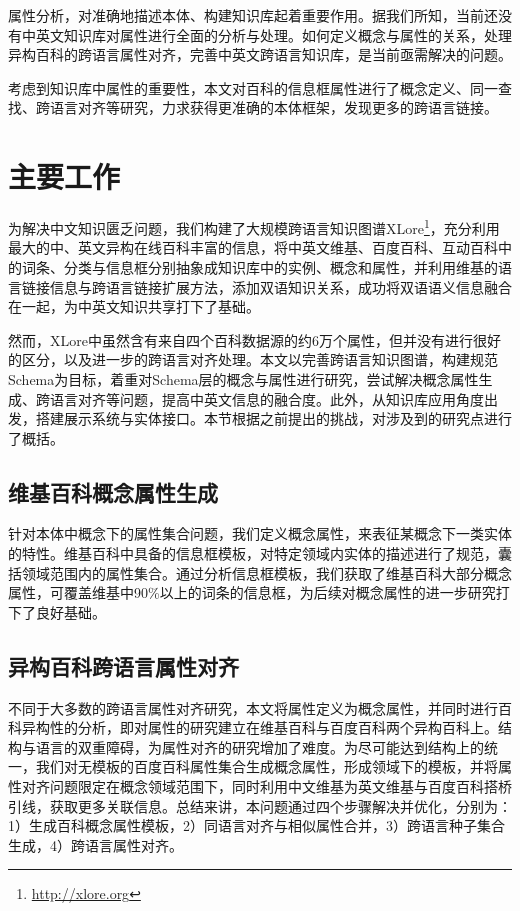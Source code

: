 属性分析，对准确地描述本体、构建知识库起着重要作用。据我们所知，当前还没有中英文知识库对属性进行全面的分析与处理。如何定义概念与属性的关系，处理异构百科的跨语言属性对齐，完善中英文跨语言知识库，是当前亟需解决的问题。

考虑到知识库中属性的重要性，本文对百科的信息框属性进行了概念定义、同一查找、跨语言对齐等研究，力求获得更准确的本体框架，发现更多的跨语言链接。

\section{主要工作}
为解决中文知识匮乏问题，我们构建了大规模跨语言知识图谱XLore\footnote{\url{http://xlore.org}}，充分利用最大的中、英文异构在线百科丰富的信息，将中英文维基、百度百科、互动百科中的词条、分类与信息框分别抽象成知识库中的实例、概念和属性，并利用维基的语言链接信息与跨语言链接扩展方法\cite{wang2012cross}，添加双语知识关系，成功将双语语义信息融合在一起，为中英文知识共享打下了基础。

然而，XLore中虽然含有来自四个百科数据源的约6万个属性，但并没有进行很好的区分，以及进一步的跨语言对齐处理。本文以完善跨语言知识图谱，构建规范Schema为目标，着重对Schema层的概念与属性进行研究，尝试解决概念属性生成、跨语言对齐等问题，提高中英文信息的融合度。此外，从知识库应用角度出发，搭建展示系统与实体接口。本节根据之前提出的挑战，对涉及到的研究点进行了概括。

\subsection{维基百科概念属性生成}
针对本体中概念下的属性集合问题，我们定义概念属性，来表征某概念下一类实体的特性。维基百科中具备的信息框模板，对特定领域内实体的描述进行了规范，囊括领域范围内的属性集合。通过分析信息框模板，我们获取了维基百科大部分概念属性，可覆盖维基中90\%以上的词条的信息框，为后续对概念属性的进一步研究打下了良好基础。


\subsection{异构百科跨语言属性对齐}
不同于大多数的跨语言属性对齐研究，本文将属性定义为概念属性，并同时进行百科异构性的分析，即对属性的研究建立在维基百科与百度百科两个异构百科上。结构与语言的双重障碍，为属性对齐的研究增加了难度。为尽可能达到结构上的统一，我们对无模板的百度百科属性集合生成概念属性，形成领域下的模板，并将属性对齐问题限定在概念领域范围下，同时利用中文维基为英文维基与百度百科搭桥引线，获取更多关联信息。总结来讲，本问题通过四个步骤解决并优化，分别为：1）生成百科概念属性模板，2）同语言对齐与相似属性合并，3）跨语言种子集合生成，4）跨语言属性对齐。

